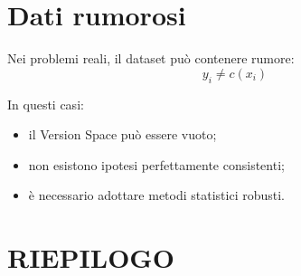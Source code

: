 \documentclass[a4paper,12pt]{report}
\begin{document}
\section{Dati rumorosi}

Nei problemi reali, il dataset può contenere rumore:
\[
y_i \neq c(x_i)
\]

In questi casi:
\begin{itemize}
    \item il Version Space può essere vuoto;
    \item non esistono ipotesi perfettamente consistenti;
    \item è necessario adottare metodi statistici robusti.
\end{itemize}

\section*{RIEPILOGO}
\end{document}
